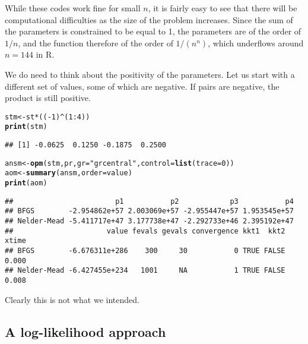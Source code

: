 \documentclass[11pt]{article}\usepackage[]{graphicx}\usepackage[]{color}
\makeatletter
\newcommand{\hlnum}[1]{\textcolor[rgb]{0.686,0.059,0.569}{#1}}%
\newcommand{\hlstr}[1]{\textcolor[rgb]{0.192,0.494,0.8}{#1}}%
\newcommand{\hlopt}[1]{\textcolor[rgb]{0,0,0}{#1}}%
\newcommand{\hlstd}[1]{\textcolor[rgb]{0.345,0.345,0.345}{#1}}%
\newcommand{\hlkwb}[1]{\textcolor[rgb]{0.69,0.353,0.396}{#1}}%
\newcommand{\hlkwc}[1]{\textcolor[rgb]{0.333,0.667,0.333}{#1}}%
\newcommand{\hlkwd}[1]{\textcolor[rgb]{0.737,0.353,0.396}{\textbf{#1}}}%
\newenvironment{kframe}{%
 \def\at@end@of@kframe{}%
 \ifinner\ifhmode%
  \def\at@end@of@kframe{\end{minipage}}%
  \begin{minipage}{\columnwidth}%
 \fi\fi%
 \def\FrameCommand##1{\hskip\@totalleftmargin \hskip-\fboxsep
 \colorbox{shadecolor}{##1}\hskip-\fboxsep
     \hskip-\linewidth \hskip-\@totalleftmargin \hskip\columnwidth}%
 \MakeFramed {\advance\hsize-\width
   \@totalleftmargin\z@ \linewidth\hsize
   \@setminipage}}%
 {\par\unskip\endMakeFramed%
 \at@end@of@kframe}
\newenvironment{knitrout}{}{} %
\newcommand{\R}{{\sf R}}
\makeatother
\begin{document}
While these codes work fine for small $n$, it is fairly easy to see that there will be 
computational difficulties as the size of the problem increases. Since the sum of the 
parameters is constrained to be equal to 1, the parameters are of the order of $1/n$,
and the function therefore of the order of $1/(n^n)$, which underflows around $n=144$ in 
\R. 

We do need to think about the positivity of the parameters. Let us start with 
a different set of values, some of which are negative. If pairs are negative, the 
product is still positive.

\begin{knitrout}\scriptsize
{}\color{fgcolor}\begin{kframe}
\begin{alltt}
\hlstd{stm} \hlkwb{<-} \hlstd{st}\hlopt{*}\hlstd{((}\hlopt{-}\hlnum{1}\hlstd{)}\hlopt{^}\hlstd{(}\hlnum{1}\hlopt{:}\hlnum{4}\hlstd{))}
\hlkwd{print}\hlstd{(stm)}
\end{alltt}
\begin{verbatim}
## [1] -0.0625  0.1250 -0.1875  0.2500
\end{verbatim}
\begin{alltt}
\hlstd{ansm}\hlkwb{<-}\hlkwd{opm}\hlstd{(stm, pr,} \hlkwc{gr}\hlstd{=}\hlstr{"grcentral"}\hlstd{,} \hlkwc{control}\hlstd{=}\hlkwd{list}\hlstd{(}\hlkwc{trace}\hlstd{=}\hlnum{0}\hlstd{))}
\hlstd{aom} \hlkwb{<-} \hlkwd{summary}\hlstd{(ansm,} \hlkwc{order}\hlstd{=value)}
\hlkwd{print}\hlstd{(aom)}
\end{alltt}
\begin{verbatim}
##                        p1           p2            p3           p4
## BFGS        -2.954862e+57 2.003069e+57 -2.955447e+57 1.953545e+57
## Nelder-Mead -5.411717e+47 3.177738e+47 -2.292733e+46 2.395192e+47
##                      value fevals gevals convergence kkt1  kkt2 xtime
## BFGS        -6.676311e+286    300     30           0 TRUE FALSE 0.000
## Nelder-Mead -6.427455e+234   1001     NA           1 TRUE FALSE 0.008
\end{verbatim}
\end{kframe}
\end{knitrout}

Clearly this is not what we intended.

\subsection{A log-likelihood approach}
\end{document}

